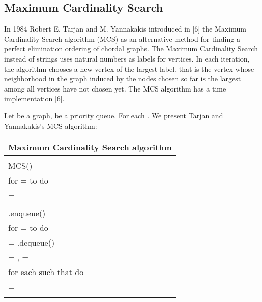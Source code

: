 \documentclass[a4paper, 11pt]{article}
\begin{document}
\subsection{Maximum Cardinality Search}

In 1984 Robert E. Tarjan and M. Yannakakis introduced in [6] the Maximum Cardinality Search
algorithm (MCS) as an alternative method for~finding a perfect elimination ordering of chordal 
graphs. The Maximum Cardinality Search instead of strings uses natural numbers as labels for 
vertices. In each iteration, the algorithm chooses a new vertex of the largest label, that is 
the vertex whose neighborhood in the graph induced by the nodes chosen so far is the largest 
among all vertices have not chosen yet. The MCS algorithm has a  time implementation [6].

Let  be a graph,  be a priority queue. For each  .
We present Tarjan and Yannakakis's MCS algorithm:\\

    \begin{tabular}{l}
        \hline
        Maximum Cardinality Search algorithm\\
        \hline
        \\
        MCS()\\
        \hspace{0.5cm}  for  =  to  do\\
        \hspace{1cm}         = \\
        \hspace{1cm}        \\
        \hspace{1cm}        .enqueue()\\
        \hspace{0.5cm}  for  =  to  do\\
        \hspace{1cm}         = .dequeue()\\
        \hspace{1cm}         = ,  = \\
        \hspace{1cm}        for each  such that  do\\
        \hspace{1.5cm}           = \\
        \\
        \hline
        
    \end{tabular}\\
\end{document}
